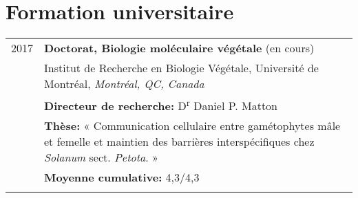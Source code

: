\documentclass[letterpaper,10pt]{article}
\begin{document}
\pagestyle{empty} %



\par{\bigskip\par}
\par{





\section{Formation universitaire}
\begin{tabular}{r|p{14cm}}
 2017 & \textbf{Doctorat, Biologie moléculaire végétale} (en cours) \\
 & Institut de Recherche en Biologie Végétale, Université de Montréal, \emph{Montréal, QC, Canada}\\
 & {\small \textbf{Directeur de recherche:} D\textsuperscript{r} Daniel P. Matton}\\
 & {\small \textbf{Thèse:} « Communication cellulaire entre gamétophytes mâle et femelle et maintien des barrières interspécifiques chez \emph{Solanum} sect. \emph{Petota}. »}\\
 & {\small \textbf{Moyenne cumulative:} 4,3/4,3}\\
 \multicolumn{2}{c}{} \\


\end{tabular}}
\end{document}

